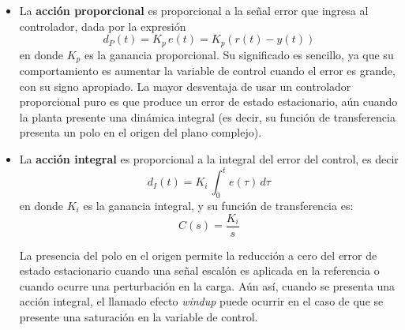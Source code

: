 \begin{itemize}
  \item La \textbf{acción proporcional} es proporcional a la señal error que ingresa al controlador, dada por la expresión
  \begin{equation*}
    d_P(t) = K_p \, e(t) = K_p \left( r(t) - y(t) \right)
  \end{equation*}
  en donde $K_p$ es la ganancia proporcional. Su significado es sencillo, ya que su comportamiento es aumentar la variable de control cuando el error es grande, con su signo apropiado. La mayor desventaja de usar un controlador proporcional puro es que produce un error de estado estacionario, aún cuando la planta presente una dinámica integral (es decir, su función de transferencia presenta un polo en el origen del plano complejo).
  \item La \textbf{acción integral} es proporcional a la integral del error del control, es decir
  \begin{equation*}
    d_I(t) = K_i \, \int_{0}^{t} e(\tau) \, d\tau
  \end{equation*}
  en donde $K_i$ es la ganancia integral, y su función de transferencia es:
  \begin{equation*}
    C(s) = \frac{K_i}{s}
  \end{equation*}

  La presencia del polo en el origen permite la reducción a cero del error de estado estacionario cuando una señal escalón es aplicada en la referencia o cuando ocurre una perturbación en la carga. Aún así, cuando se presenta una acción integral, el llamado efecto \emph{windup} puede ocurrir en el caso de que se presente una saturación en la variable de control.


\end{itemize}
